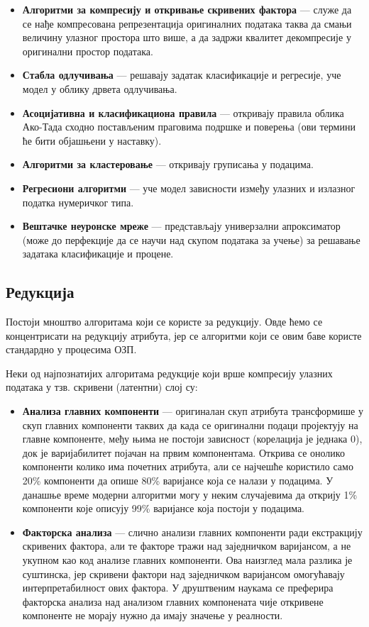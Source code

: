 \begin{itemize}
  \item \textbf{Алгоритми за компресију и откривање скривених фактора} — служе да се нађе компресована репрезентација оригиналних података таква да смањи величину улазног простора што више, а да задржи квалитет декомпресије у оригинални простор података.
  \item \textbf{Стабла одлучивања} — решавају задатак класификације и регресије, уче модел у облику дрвета одлучивања.
  \item \textbf{Асоцијативна и класификациона правила} — откривају правила облика Ако-Тада сходно постављеним праговима подршке и поверења (ови термини ће бити објашњени у наставку).
  \item \textbf{Алгоритми за кластеровање} — откривају груписања у подацима.
  \item \textbf{Регресиони алгоритми} — уче модел зависности између улазних и излазног податка нумеричког типа.
  \item \textbf{Вештачке неуронске мреже} — представљају универзални апроксиматор (може до перфекције да се научи над скупом података за учење) за решавање задатака класификације и процене.
\end{itemize}

\subsection{Редукција}
Постоји мноштво алгоритама који се користе за редукцију. Овде ћемо се концентрисати на редукцију атрибута, јер се алгоритми који се овим баве користе стандардно у процесима ОЗП.

Неки од најпознатијих алгоритама редукције који врше компресију улазних података у тзв. скривени (латентни) слој су:

\begin{itemize}
  \item \textbf{Анализа главних компоненти} — оригиналан скуп атрибута трансформише у скуп главних компоненти таквих да када се оригинални подаци пројектују на главне компоненте, међу њима не постоји зависност (корелација је једнака 0), док је варијабилитет појачан на првим компонентама. Открива се онолико компоненти колико има почетних атрибута, али се најчешће користило само 20\% компоненти да опише 80\% варијансе која се налази у подацима. У данашње време модерни алгоритми могу у неким случајевима да открију 1\% компоненти које описују 99\% варијансе која постоји у подацима.
  \item \textbf{Факторска анализа} — слично анализи главних компоненти ради екстракцију скривених фактора, али те факторе тражи над заједничком варијансом, а не укупном као код анализе главних компоненти. Ова наизглед мала разлика је суштинска, јер скривени фактори над заједничком варијансом омогућавају интерпретабилност ових фактора. У друштвеним наукама се преферира факторска анализа над анализом главних компонената чије откривене компоненте не морају нужно да имају значење у реалности.
\end{itemize}

